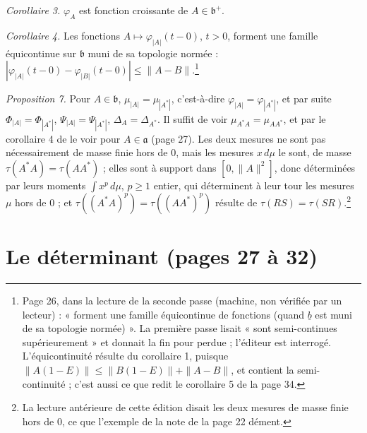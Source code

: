\documentclass[11pt,a4paper]{article}
\begin{document}
\emph{Corollaire 3.} $\varphi_A$ est fonction croissante de
$A \in \mathfrak{b}^{+}$.

\emph{Corollaire 4.} Les fonctions $A \mapsto \varphi_{|A|}(t{-}0)$, $t >
0$, forment une famille équicontinue sur $\mathfrak{b}$ muni de sa topologie
normée : $|\varphi_{|A|}(t{-}0) - \varphi_{|B|}(t{-}0)| \leq \|A -
B\|$.\footnote{Page 26, dans la lecture de la seconde passe (machine, non
vérifiée par un lecteur) : « forment une famille équicontinue de fonctions
(quand $\underline{b}$ est muni de sa topologie normée) ». La première passe
lisait « sont semi-continues supérieurement » et donnait la fin pour perdue ;
l'éditeur est interrogé. L'équicontinuité résulte du corollaire 1, puisque
$\|A(1-E)\| \leq \|B(1-E)\| + \|A - B\|$, et contient la semi-continuité ;
c'est aussi ce que redit le corollaire 5 de la page 34.}

\emph{Proposition 7.} Pour $A \in \mathfrak{b}$, $\mu_{|A|} = \mu_{|A^{*}|}$,
c'est-à-dire $\varphi_{|A|} = \varphi_{|A^{*}|}$, et par suite $\Phi_{|A|} =
\Phi_{|A^{*}|}$, $\Psi_{|A|} = \Psi_{|A^{*}|}$, $\Delta_A = \Delta_{A^{*}}$.
Il suffit de voir $\mu_{A^{*}A} = \mu_{AA^{*}}$, et par le corollaire 4 de le
voir pour $A \in \mathfrak{a}$ (page 27). Les deux mesures ne sont pas
nécessairement de masse finie hors de $0$, mais les mesures $x\,d\mu$ le
sont, de masse $\tau(A^{*}A) = \tau(AA^{*})$ ; elles sont à support dans
$[0,\|A\|^2]$, donc déterminées par leurs moments $\int x^{p}\,d\mu$,
$p \geq 1$ entier, qui déterminent à leur tour les mesures $\mu$ hors de $0$ ;
et $\tau((A^{*}A)^p) = \tau((AA^{*})^p)$ résulte de $\tau(RS) =
\tau(SR)$.\footnote{La lecture antérieure de cette édition disait les deux
mesures de masse finie hors de $0$, ce que l'exemple de la note de la
page 22 dément.}

\section*{Le déterminant (pages 27 à 32)}
\end{document}
